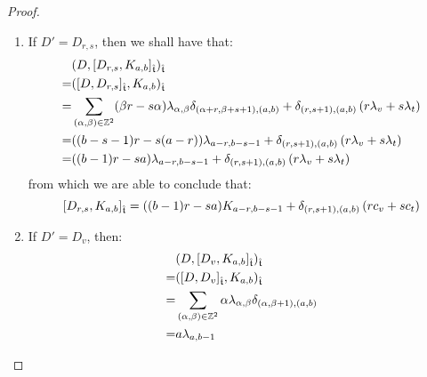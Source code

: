 \begin{proof}
\begin{enumerate}
                    \begin{enumerate}
                        \item If $D' = D_{r, s}$, then we shall have that:
                            $$
                                \begin{aligned}
                                    & ( D, [D_{r, s}, K_{a, b}]_{\hat{\mathfrak{t}}} )_{\hat{\mathfrak{t}}}
                                    \\
                                    = & ( [D, D_{r, s}]_{\hat{\mathfrak{t}}}, K_{a, b} )_{\hat{\mathfrak{t}}}
                                    \\
                                    = & \sum_{(\alpha, \beta) \in \mathbb{Z}^2} (\beta r - s \alpha) \lambda_{\alpha, \beta} \delta_{(\alpha + r, \beta + s + 1), (a, b)} + \delta_{(r, s + 1), (a, b)} \left( r\lambda_v + s\lambda_t \right)
                                    \\
                                    = & ((b - s - 1) r - s (a - r)) \lambda_{a - r, b - s - 1} + \delta_{(r, s + 1), (a, b)} \left( r\lambda_v + s\lambda_t \right)
                                    \\
                                    = & ((b - 1)r - sa) \lambda_{a - r, b - s - 1} + \delta_{(r, s + 1), (a, b)} \left( r\lambda_v + s\lambda_t \right)
                                \end{aligned}
                            $$
                        from which we are able to conclude that:
                            $$[D_{r, s}, K_{a, b}]_{\hat{\mathfrak{t}}} = ((b - 1)r - sa) K_{a - r, b - s - 1} + \delta_{(r, s + 1), (a, b)} \left( r c_v + s c_t \right)$$
                        \item If $D' = D_v$, then:
                            $$
                                \begin{aligned}
                                    & ( D, [D_v, K_{a, b}]_{\hat{\mathfrak{t}}} )_{\hat{\mathfrak{t}}}
                                    \\
                                    = & ( [D, D_v]_{\hat{\mathfrak{t}}}, K_{a, b} )_{\hat{\mathfrak{t}}}
                                    \\
                                    = & \sum_{(\alpha, \beta) \in \mathbb{Z}^2} \alpha \lambda_{\alpha, \beta} \delta_{(\alpha, \beta + 1), (a, b)} 
                                    \\
                                    = & a \lambda_{a, b - 1}
                                \end{aligned}
$$
\end{enumerate}
\end{enumerate}
\end{proof}
